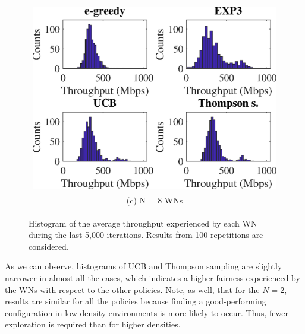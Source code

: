 \documentclass[10pt,journal,compsoc]{IEEEtran}
\begin{document}
\begin{figure}
		\begin{tabular}{@{}c@{}}
			\includegraphics[width=.35\textwidth]{images/hist_mean_tpt_8_WNs} \\[\abovecaptionskip]
			\small (c) N = 8 WNs
			\label{fig:hist_imean_throughput_8}
		\end{tabular}
		\caption{Histogram of the average throughput experienced by each WN during the last 5,000 iterations. Results from 100 repetitions are considered.}
		\label{fig:hist_mean_tpt}
	\end{figure}
	
	As we can observe, histograms of UCB and Thompson sampling are slightly narrower in almost all the cases, which indicates a higher fairness experienced by the WNs with respect to the other policies. Note, as well, that for the $N = 2$, results are similar for all the policies because finding a good-performing configuration in low-density environments is more likely to occur. Thus, fewer exploration is required than for higher densities. 
	
\end{document}
